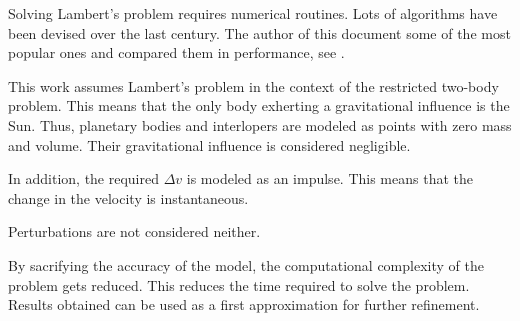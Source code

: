 Solving Lambert's problem requires numerical routines. Lots of algorithms have
been devised over the last century. The author of this document some of the most
popular ones and compared them in performance, see \cite{martinez2021}.

This work assumes Lambert's problem in the context of the restricted two-body
problem. This means that the only body exherting a gravitational influence is
the Sun. Thus, planetary bodies and interlopers are modeled as points with zero
mass and volume. Their gravitational influence is considered negligible.

In addition, the required $\Delta v$ is modeled as an impulse. This means that
the change in the velocity is instantaneous.

Perturbations are not considered neither.

By sacrifying the accuracy of the model, the computational complexity of the
problem gets reduced. This reduces the time required to solve the problem.
Results obtained can be used as a first approximation for further refinement.
